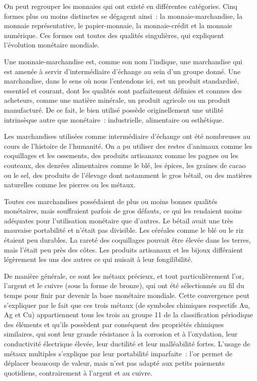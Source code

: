 On peut regrouper les monnaies qui ont existé en différentes catégories. Cinq formes plus ou moins distinctes se dégagent ainsi~: la monnaie-marchandise, la monnaie représentative, le papier-monnaie, la monnaie-crédit et la monnaie numérique. Ces formes ont toutes des qualités singulières, qui expliquent l'évolution monétaire mondiale. 


Une monnaie-marchandise est, comme son nom l'indique, une marchandise qui est amenée à servir d'intermédiaire d'échange au sein d'un groupe donné. Une marchandise, dans le sens où nous l'entendons ici, est un produit standardisé, essentiel et courant, dont les qualités sont parfaitement définies et connues des acheteurs, comme une matière minérale, un produit agricole ou un produit manufacturé. De ce fait, le bien utilisé possède originellement une utilité intrinsèque autre que monétaire~: industrielle, alimentaire ou esthétique.

Les marchandises utilisées comme intermédiaire d'échange ont été nombreuses au cours de l'histoire de l'humanité. On a pu utiliser des restes d'animaux comme les coquillages et les ossements, des produits artisanaux comme les pagnes ou les couteaux, des denrées alimentaires comme le blé, les épices, les graines de cacao ou le sel, des produits de l'élevage dont notamment le gros bétail, ou des matières naturelles comme les pierres ou les métaux.

Toutes ces marchandises possédaient de plus ou moins bonnes qualités monétaires, mais souffraient parfois de gros défauts, ce qui les rendaient moins adéquates pour l'utilisation monétaire que d'autres. Le bétail avait une très mauvaise portabilité et n'était pas divisible. Les céréales comme le blé ou le riz étaient peu durables. La rareté des coquillages pouvait être élevée dans les terres, mais l'était peu près des côtes. Les produits artisanaux et les bijoux différaient légèrement les uns des autres ce qui nuisait à leur fongilibilité.

De manière générale, ce sont les métaux précieux, et tout particulièrement l'or, l'argent et le cuivre (sous la forme de bronze), qui ont été sélectionnés au fil du temps pour finir par devenir la base monétaire mondiale. Cette convergence peut s'expliquer par le fait que ces trois métaux (de symboles chimiques respectifs Au, Ag et Cu) appartiennent tous les trois au groupe 11 de la classification périodique des éléments et qu'ils possèdent par conséquent des propriétés chimiques similaires, qui sont leur grande résistance à la corrosion et à l'oxydation, leur conductivité électrique élevée, leur ductilité et leur malléabilité fortes. L'usage de métaux multiples s'explique par leur portabilité imparfaite~: l'or permet de déplacer beaucoup de valeur, mais n'est pas adapté aux petits paiements quotidiens, contrairement à l'argent et au cuivre.

